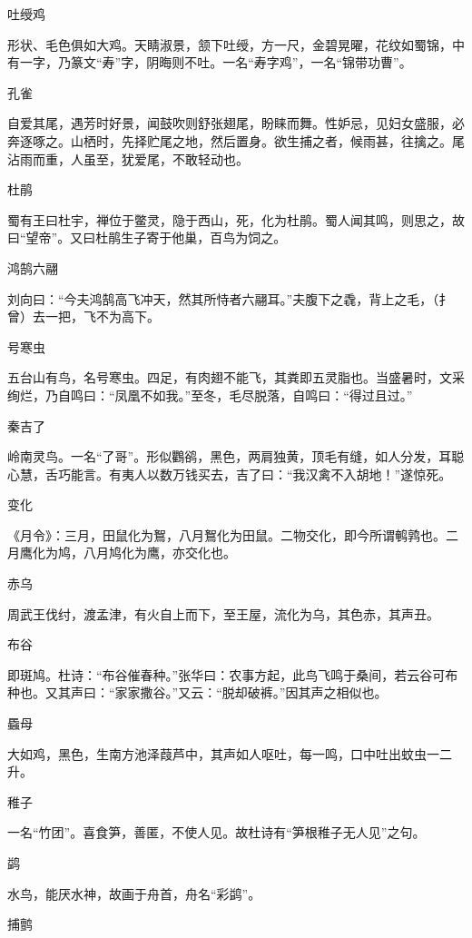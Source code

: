 \documentclass[a4paper,12pt,UTF8,twoside]{ctexbook}
\begin{document}
    吐绶鸡
    
    形状、毛色俱如大鸡。天睛淑景，颔下吐绶，方一尺，金碧晃曜，花纹如蜀锦，中有一字，乃篆文“寿”字，阴晦则不吐。一名“寿字鸡”，一名“锦带功曹”。
    
    孔雀
    
    自爱其尾，遇芳时好景，闻鼓吹则舒张翅尾，盼睐而舞。性妒忌，见妇女盛服，必奔逐啄之。山栖时，先择贮尾之地，然后置身。欲生捕之者，候雨甚，往擒之。尾沾雨而重，人虽至，犹爱尾，不敢轻动也。
    
    杜鹃
    
    蜀有王曰杜宇，禅位于鳖灵，隐于西山，死，化为杜鹃。蜀人闻其鸣，则思之，故曰“望帝”。又曰杜鹃生子寄于他巢，百鸟为饲之。
    
    鸿鹄六翮
    
    刘向曰：“今夫鸿鹄高飞冲天，然其所恃者六翮耳。”夫腹下之毳，背上之毛，（扌曾）去一把，飞不为高下。
    
    号寒虫
    
    五台山有鸟，名号寒虫。四足，有肉翅不能飞，其粪即五灵脂也。当盛暑时，文采绚烂，乃自鸣曰：“凤凰不如我。”至冬，毛尽脱落，自鸣曰：“得过且过。”
    
    秦吉了
    
    岭南灵鸟。一名“了哥”。形似鸜鹆，黑色，两肩独黄，顶毛有缝，如人分发，耳聪心慧，舌巧能言。有夷人以数万钱买去，吉了曰：“我汉禽不入胡地！”遂惊死。
    
    变化
    
    《月令》：三月，田鼠化为鴽，八月鴽化为田鼠。二物交化，即今所谓鹌鹑也。二月鹰化为鸠，八月鸠化为鹰，亦交化也。
    
    赤乌
    
    周武王伐纣，渡孟津，有火自上而下，至王屋，流化为乌，其色赤，其声丑。
    
    布谷
    
    即斑鸠。杜诗：“布谷催春种。”张华曰：农事方起，此鸟飞鸣于桑间，若云谷可布种也。又其声曰：“家家撒谷。”又云：“脱却破裤。”因其声之相似也。
    
    蟁母
    
    大如鸡，黑色，生南方池泽葭芦中，其声如人呕吐，每一鸣，口中吐出蚊虫一二升。
    
    稚子
    
    一名“竹团”。喜食笋，善匿，不使人见。故杜诗有“笋根稚子无人见”之句。
    
    鹢
    
    水鸟，能厌水神，故画于舟首，舟名“彩鹢”。
    
    捕鹯
    
\end{document}
